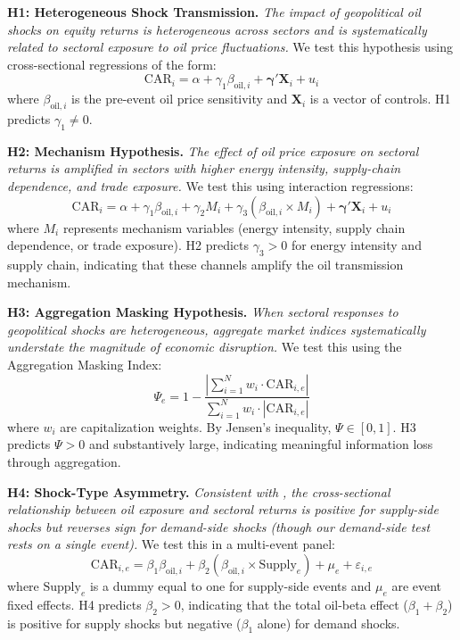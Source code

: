 \documentclass[12pt,preprint,authoryear]{elsarticle}
\begin{document}
\bigskip
\noindent\textbf{H1: Heterogeneous Shock Transmission.} \textit{The impact of geopolitical oil shocks on equity returns is heterogeneous across sectors and is systematically related to sectoral exposure to oil price fluctuations.}
We test this hypothesis using cross-sectional regressions of the form:
\begin{equation}
    \text{CAR}_i = \alpha + \gamma_1 \beta_{\text{oil},i} + \boldsymbol{\gamma}' \mathbf{X}_i + u_i
\end{equation}
where $\beta_{\text{oil},i}$ is the pre-event oil price sensitivity and $\mathbf{X}_i$ is a vector of controls. H1 predicts $\gamma_1 \neq 0$.

\bigskip
\noindent\textbf{H2: Mechanism Hypothesis.} \textit{The effect of oil price exposure on sectoral returns is amplified in sectors with higher energy intensity, supply-chain dependence, and trade exposure.}
We test this using interaction regressions:
\begin{equation}
    \text{CAR}_i = \alpha + \gamma_1 \beta_{\text{oil},i} + \gamma_2 M_i + \gamma_3 (\beta_{\text{oil},i} \times M_i) + \boldsymbol{\gamma}' \mathbf{X}_i + u_i
\end{equation}
where $M_i$ represents mechanism variables (energy intensity, supply chain dependence, or trade exposure). H2 predicts $\gamma_3 > 0$ for energy intensity and supply chain, indicating that these channels amplify the oil transmission mechanism.

\bigskip
\noindent\textbf{H3: Aggregation Masking Hypothesis.} \textit{When sectoral responses to geopolitical shocks are heterogeneous, aggregate market indices systematically understate the magnitude of economic disruption.}
We test this using the Aggregation Masking Index:
\begin{equation}
    \Psi_e = 1 - \frac{\left|\sum_{i=1}^{N} w_i \cdot \text{CAR}_{i,e}\right|}{\sum_{i=1}^{N} w_i \cdot |\text{CAR}_{i,e}|}
\end{equation}
where $w_i$ are capitalization weights. By Jensen's inequality, $\Psi \in [0,1]$. H3 predicts $\Psi > 0$ and substantively large, indicating meaningful information loss through aggregation.

\bigskip
\noindent\textbf{H4: Shock-Type Asymmetry.} \textit{Consistent with \citet{kilian2009not}, the cross-sectional relationship between oil exposure and sectoral returns is positive for supply-side shocks but reverses sign for demand-side shocks (though our demand-side test rests on a single event).}
We test this in a multi-event panel:
\begin{equation}
    \text{CAR}_{i,e} = \beta_1 \beta_{\text{oil},i} + \beta_2 (\beta_{\text{oil},i} \times \text{Supply}_e) + \mu_e + \varepsilon_{i,e}
\end{equation}
where $\text{Supply}_e$ is a dummy equal to one for supply-side events and $\mu_e$ are event fixed effects. H4 predicts $\beta_2 > 0$, indicating that the total oil-beta effect ($\beta_1 + \beta_2$) is positive for supply shocks but negative ($\beta_1$ alone) for demand shocks.
\end{document}
